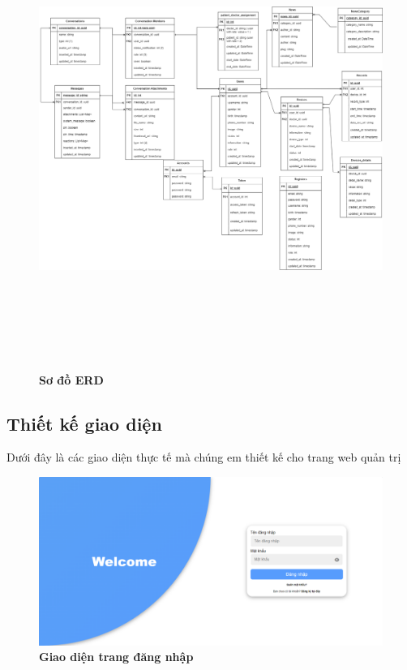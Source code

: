 \begin{figure}[H]
  \centering
  \includegraphics[width=15cm,height=15cm]{Images/system/fmECG_database.png}
  \caption[Sơ đồ ERD]{\bfseries \fontsize{12pt}{0pt}\selectfont Sơ đồ ERD}
  \label{fmECG_architecture-Database} %
\end{figure}

\subsection{Thiết kế giao diện}

Dưới đây là các giao diện thực tế mà chúng em thiết kế cho trang web quản trị


\begin{figure}[H]
  \centering
  \includegraphics[scale=0.7]{Images/server/webUI/login.PNG}
  \caption[Giao diện trang đăng nhập]{\bfseries \fontsize{12pt}{0pt}\selectfont Giao diện trang đăng nhập}
  \label{login} %
\end{figure}

